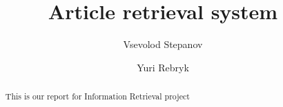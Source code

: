 \documentclass[sigconf]{acmart}
\begin{document}
\title{Article retrieval system}


\author{Vsevolod Stepanov}

\author{Yuri Rebryk}


\begin{abstract}
    This is our report for Information Retrieval project
\end{abstract}

\maketitle




 
\end{document}
